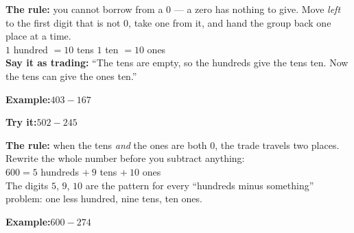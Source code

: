 \documentclass[12pt]{article}
\begin{document}


\begin{formulabox}
\textbf{The rule:} you cannot borrow from a $0$ --- a zero has nothing to give.
Move \emph{left} to the first digit that is not $0$, take one from it, and hand
the group back one place at a time.\\[3pt]
$1$ hundred $= 10$ tens \qquad $1$ ten $= 10$ ones\\[3pt]
\textbf{Say it as trading:} ``The tens are empty, so the hundreds give the tens
ten. Now the tens can give the ones ten.''
\end{formulabox}

\begin{examplebox}
\textbf{Example:}\quad $403 - 167$
\end{examplebox}

\begin{tryitbox}
\textbf{Try it:}\quad $502 - 245$\\[2pt]
\end{tryitbox}


\begin{formulabox}
\textbf{The rule:} when the tens \emph{and} the ones are both $0$, the trade
travels two places. Rewrite the whole number before you subtract anything:\\[3pt]
$600 = 5$ hundreds $+\ 9$ tens $+\ 10$ ones\\[3pt]
The digits $5$, $9$, $10$ are the pattern for every ``hundreds minus something''
problem: one less hundred, nine tens, ten ones.
\end{formulabox}

\begin{examplebox}
\textbf{Example:}\quad $600 - 274$
\end{examplebox}
\end{document}
